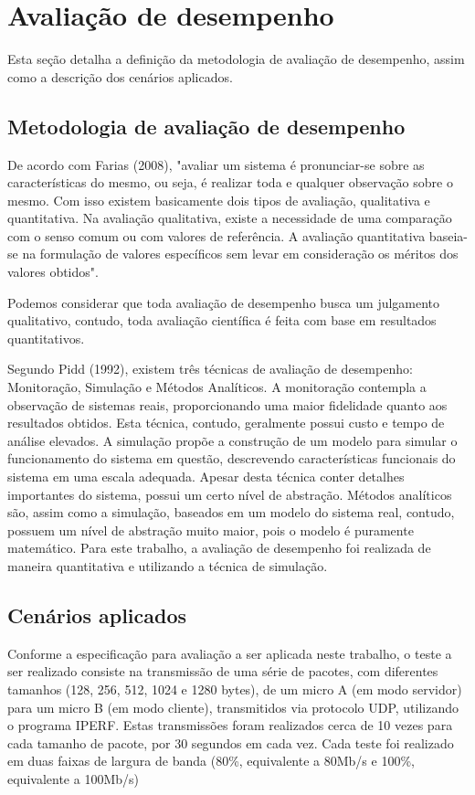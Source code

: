 \documentclass[12pt]{article}
\begin{document}
\section{Avaliação de desempenho}

Esta seção detalha a definição da metodologia de avaliação de desempenho, assim como a descrição dos cenários aplicados.

\subsection{Metodologia de avaliação de desempenho}
De acordo com Farias (2008), "avaliar um sistema é pronunciar-se sobre as características do mesmo, ou seja, é realizar toda
e qualquer observação sobre o mesmo. Com isso existem basicamente dois tipos de avaliação,
qualitativa e quantitativa. Na avaliação qualitativa, existe a necessidade de uma comparação com
o senso comum ou com valores de referência. A avaliação quantitativa baseia-se na formulação
de valores específicos sem levar em consideração os méritos dos valores obtidos".

Podemos considerar que toda avaliação de desempenho busca um julgamento qualitativo, contudo, toda avaliação científica é feita com base em resultados quantitativos.

Segundo Pidd (1992), existem três técnicas de avaliação de desempenho: Monitoração, Simulação e Métodos Analíticos.
A monitoração contempla a observação de sistemas reais, proporcionando uma maior fidelidade quanto aos resultados obtidos.
Esta técnica, contudo, geralmente possui custo e tempo de análise elevados. A simulação propõe a construção de um modelo para simular o funcionamento do sistema em questão, descrevendo características funcionais do sistema em uma escala adequada. Apesar desta técnica conter detalhes importantes do sistema, possui um certo nível de abstração.
Métodos analíticos são, assim como a simulação, baseados em um modelo do sistema real, contudo, possuem um nível de abstração muito maior, pois o modelo é puramente matemático.
Para este trabalho, a avaliação de desempenho foi realizada de maneira quantitativa e utilizando a técnica de simulação.

\subsection{Cenários aplicados}

Conforme a especificação para avaliação a ser aplicada neste trabalho, o teste a ser realizado consiste na transmissão de uma série de pacotes, com diferentes tamanhos (128, 256, 512, 1024 e 1280 bytes), de um micro A (em modo servidor) para um micro B (em modo cliente), transmitidos via protocolo UDP, utilizando o programa IPERF. Estas transmissões foram realizados cerca de 10 vezes para cada tamanho de pacote, por 30 segundos em cada vez. Cada teste foi realizado em duas faixas de largura de banda (80\%, equivalente a 80Mb/s e 100\%, equivalente a 100Mb/s)
\end{document}

